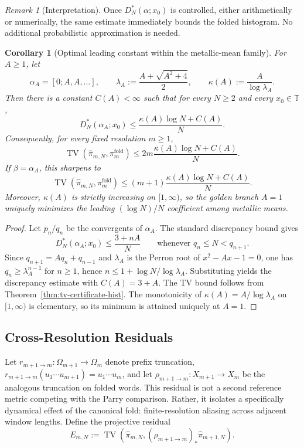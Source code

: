 \documentclass[11pt,letterpaper]{article}
\numberwithin{equation}{section}
\theoremstyle{plain}
\newtheorem{corollary}[theorem]{Corollary}
\theoremstyle{definition}
\theoremstyle{remark}
\newtheorem{remark}[theorem]{Remark}
\newcommand{\TT}{\mathbb{T}}
\DeclareMathOperator{\TV}{TV}
\begin{document}
\begin{remark}[Interpretation]
Once \(D_N^*(\alpha;x_0)\) is controlled, either arithmetically or numerically,
the same estimate immediately bounds the folded histogram. No additional
probabilistic approximation is needed.
\end{remark}

\begin{corollary}[Optimal leading constant within the metallic-mean family]
\label{cor:metallic-mean-golden-unique-optimal-tv-constant}
For $A\ge 1$, let
\[
\alpha_A=[0;A,A,\dots],\qquad
\lambda_A:=\frac{A+\sqrt{A^2+4}}{2},\qquad
\kappa(A):=\frac{A}{\log\lambda_A}.
\]
Then there is a constant $C(A)<\infty$ such that for every $N\ge 2$ and every
$x_0\in\TT$,
\[
D_N^*(\alpha_A;x_0)\le \frac{\kappa(A)\log N+C(A)}{N}.
\]
Consequently, for every fixed resolution $m\ge 1$,
\[
\TV(\hat\pi_{m,N},\pi_m^{\mathrm{fold}})
\le
2m\frac{\kappa(A)\log N+C(A)}{N}.
\]
If \(\beta=\alpha_A\), this sharpens to
\[
\TV(\hat\pi_{m,N},\pi_m^{\mathrm{fold}})
\le
(m+1)\frac{\kappa(A)\log N+C(A)}{N}.
\]
Moreover, $\kappa(A)$ is strictly increasing on $[1,\infty)$, so the golden
branch $A=1$ uniquely minimizes the leading $(\log N)/N$ coefficient among
metallic means.
\end{corollary}

\begin{proof}
Let $p_n/q_n$ be the convergents of $\alpha_A$.  The standard discrepancy bound
\cite{KuipersNiederreiter1974} gives
\[
D_N^*(\alpha_A;x_0)\le \frac{3+nA}{N}
\qquad \text{whenever } q_n\le N<q_{n+1}.
\]
Since $q_{n+1}=Aq_n+q_{n-1}$ and $\lambda_A$ is the Perron root of
$x^2-Ax-1=0$, one has $q_n\ge \lambda_A^{n-1}$ for $n\ge 1$, hence
$n\le 1+\log N/\log\lambda_A$.  Substituting yields the discrepancy estimate
with $C(A)=3+A$.  The TV bound follows from
Theorem~\ref{thm:tv-certificate-hist}.  The monotonicity of
$\kappa(A)=A/\log\lambda_A$ on $[1,\infty)$ is elementary, so its minimum is
attained uniquely at $A=1$.
\end{proof}

\subsection{Cross-Resolution Residuals}

Let $r_{m+1\to m}:\Omega_{m+1}\to\Omega_m$ denote prefix truncation,
$r_{m+1\to m}(u_1\cdots u_{m+1})=u_1\cdots u_m$, and let
$\rho_{m+1\to m}:X_{m+1}\to X_m$ be the analogous truncation on folded words.
This residual is not a second reference metric competing with the Parry
comparison. Rather, it isolates a specifically dynamical effect of the canonical
fold: finite-resolution aliasing across adjacent window lengths.
Define the projective residual
\[
E_{m,N}
:=
\TV\!\left(\hat\pi_{m,N},(\rho_{m+1\to m})_*\hat\pi_{m+1,N}\right).
\]
\end{document}
